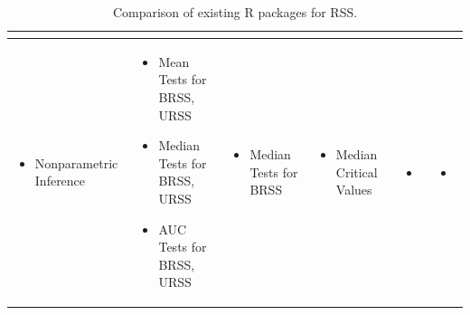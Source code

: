 \begin{table}[!ht]
{\begin{tabular}{p{2.5cm} p{3.3cm} p{3cm} p{3cm} p{3.1cm} p{3cm}}
\begin{itemize}[nosep,after=\strut,leftmargin=*,topsep=0pt,itemsep=0pt,parsep=0pt,partopsep=0pt]
\end{itemize} \\ \midrule
\begin{itemize}[label={},nosep,leftmargin=*,topsep=0pt]
  \item {Nonparametric \newline Inference}
\end{itemize} & \begin{itemize}[nosep,after=\strut,leftmargin=*,topsep=0pt,itemsep=0pt,parsep=0pt,partopsep=0pt]
    \item Mean Tests \newline for BRSS, URSS
    \item Median Tests \newline for BRSS, URSS
    \item AUC Tests \newline for BRSS, URSS
\end{itemize} & \begin{itemize}[nosep,after=\strut,leftmargin=*,topsep=0pt,itemsep=0pt,parsep=0pt,partopsep=0pt]
    \item Median Tests \newline for BRSS
\end{itemize} & \begin{itemize}[nosep,after=\strut,leftmargin=*,topsep=0pt,itemsep=0pt,parsep=0pt,partopsep=0pt]
    \item Median Critical Values
\end{itemize} & \begin{itemize}[nosep,after=\strut,leftmargin=*]
    \item[--]
\end{itemize} & \begin{itemize}[nosep,after=\strut,leftmargin=*]
    \item[--]
\end{itemize} \\ \bottomrule
\end{tabular}}
\caption{Comparison of existing R packages for RSS.}\label{tab:comparison}
\end{table}




